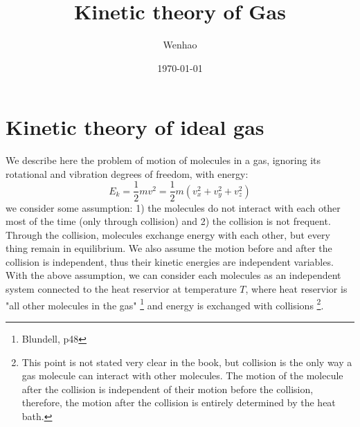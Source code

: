\documentclass{article}
\begin{document}
\title{Kinetic theory of Gas}
\author{Wenhao}
\date{\today}
\maketitle

\tableofcontents

\section{Kinetic theory of ideal gas}
We describe here the problem of motion of molecules in a gas, 
ignoring its rotational and vibration degrees of freedom, with 
energy: 
\begin{equation}
    E_k = \frac{1}{2}mv^2 = \frac{1}{2}m(v_x^2 + v_y^2 + v_z^2)
\end{equation}
we consider some assumption: 1) the molecules do not interact 
with each other most of the time (only through collision) and 2) the collision is 
not frequent. Through the collision, molecules exchange energy with each other,
but every thing remain in equilibrium. We also assume the motion before and 
after the collision is independent, thus their kinetic energies are 
independent variables. With the above assumption, we can consider 
each molecules as an independent system connected to the heat reservior at 
temperature $T$, where heat reservior is "all other molecules in the gas"
\footnote{Blundell, p48} and energy is exchanged with collisions
\footnote{This point
is not stated very clear in the book, but collision is the only way a gas molecule
can interact with other molecules. The motion of the molecule after the collision is
independent of their motion before the collision, therefore, the motion after the 
collision is entirely determined by the heat bath.}.
\end{document}
